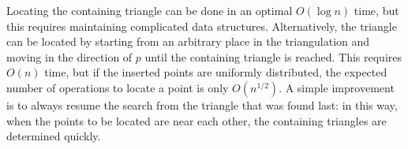 
Locating the containing triangle can be done in an optimal $O(\log n)$ time, but
this requires maintaining complicated data structures. Alternatively, the
triangle can be located by starting from an arbitrary place in the triangulation
and moving in the direction of $p$ until the containing triangle is reached.
This requires $O(n)$ time, but if the inserted points are uniformly distributed,
the expected number of operations to locate a point is only $O(n^{1/2})$. A
simple improvement is to always resume the search from the triangle that was
found last: in this way, when the points to be located are near each other, the
containing triangles are determined quickly.


